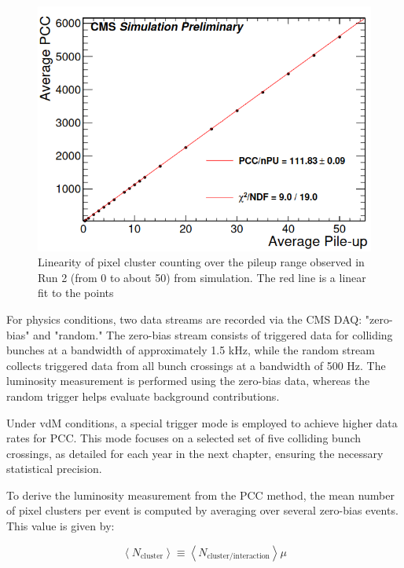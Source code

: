 \begin{center}
  \begin{figure}[h!]
    \centering
    \includegraphics[scale=.35]{Chapter3/pileup_lineality.png} 
    \caption[PCC linearity with pile-up]{ Linearity of pixel cluster counting over the pileup range observed in Run 2 (from 0 to about 50) from simulation. The red line is a linear fit to the points \cite{Phase2_Upgrade} }
    \label{pileup}
  \end{figure}
\end{center}

For physics conditions, two data streams are recorded via the CMS DAQ: "zero-bias" and "random." The zero-bias stream consists of triggered data for colliding bunches at a bandwidth of approximately 1.5 kHz, while the random stream collects triggered data from all bunch crossings at a bandwidth of 500 Hz. The luminosity measurement is performed using the zero-bias data, whereas the random trigger helps evaluate background contributions.  

Under vdM conditions, a special trigger mode is employed to achieve higher data rates for PCC. This mode focuses on a selected set of five colliding bunch crossings, as detailed for each year in the next chapter, ensuring the necessary statistical precision.  

To derive the luminosity measurement from the PCC method, the mean number of pixel clusters per event is computed by averaging over several zero-bias events. This value is given by:

\begin{equation}
\left < N_{\text{cluster}} \right > \equiv \left < N_{\text{cluster}/\text{interaction}} \right > \mu
\end{equation}

